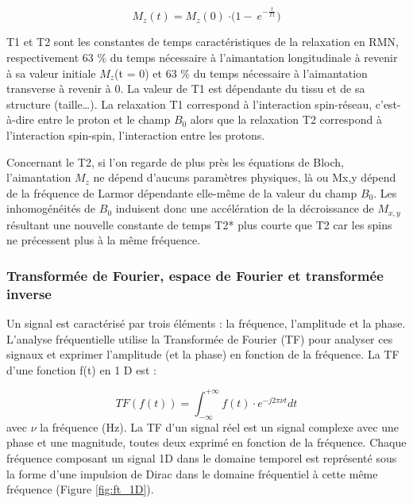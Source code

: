 \begin{equation}
\nonumber
	M_z\left(t\right)=M_z\left(0\right)\ {\cdot(1-\ e}^{-\frac{t}{T1}})
	\end{equation}

T1 et T2 sont les constantes de temps caractéristiques de la relaxation en RMN, respectivement 63 $\%$ du temps nécessaire à l’aimantation longitudinale à revenir à sa valeur initiale $M_z$(t = 0) et 63 $\%$ du temps nécessaire à l’aimantation transverse à revenir à 0. La valeur de T1 est dépendante du tissu et de sa structure (taille…). La relaxation T1 correspond à l’interaction spin-réseau, c’est-à-dire entre le proton et le champ $B_0$ alors que la relaxation T2 correspond à l’interaction spin-spin, l’interaction entre les protons.

Concernant le T2, si l’on regarde de plus près les équations de Bloch, l’aimantation $M_z$ ne dépend d’aucuns paramètres physiques, là ou Mx,y dépend de la fréquence de Larmor dépendante elle-même de la valeur du champ  $B_0$. Les inhomogénéités de $B_0$ induisent donc une accélération de la décroissance de $M_{x,y}$  résultant une nouvelle constante de temps T2* plus courte que T2 car les spins ne précessent plus à la même fréquence.

\subsubsection{Transformée de Fourier, espace de Fourier et transformée inverse}

Un signal est caractérisé par trois éléments : la fréquence, l’amplitude et la phase. L’analyse fréquentielle utilise la Transformée de Fourier (TF)  pour analyser ces signaux et exprimer l’amplitude (et la phase) en fonction de la fréquence.
 La TF d’une fonction f(t) en 1 D est :

 \begin{equation}
 \nonumber
  TF(f(t)) = \int_{-\infty}^{+\infty}{f(t)\cdot e^{-j2\pi \nu t}dt}
 \end{equation}
 avec $\nu$ la fréquence (Hz).
La TF d’un signal réel est un signal complexe avec une phase et une magnitude, toutes deux exprimé en fonction de la fréquence. Chaque fréquence composant un signal 1D dans le domaine temporel est représenté sous la forme d’une impulsion de Dirac dans le domaine fréquentiel à cette même fréquence (Figure \ref{fig:ft_1D}).

